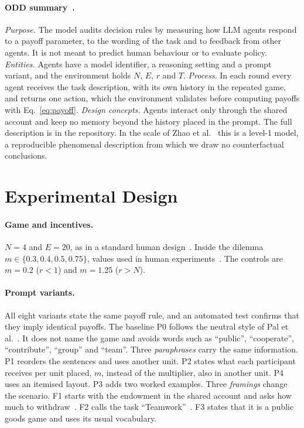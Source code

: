 \documentclass[runningheads]{llncs}
\begin{document}
\paragraph{ODD summary~\cite{grimm2020odd}.}
\emph{Purpose.} The model audits decision rules by measuring how LLM agents respond to a payoff parameter, to the wording of the task and to feedback from other agents. It is not meant to predict human behaviour or to evaluate policy. \emph{Entities.} Agents have a model identifier, a reasoning setting and a prompt variant, and the environment holds $N$, $E$, $r$ and $T$. \emph{Process.} In each round every agent receives the task description, with its own history in the repeated game, and returns one action, which the environment validates before computing payoffs with Eq.~\eqref{eq:payoff}. \emph{Design concepts.} Agents interact only through the shared account and keep no memory beyond the history placed in the prompt. The full description is in the repository. In the scale of Zhao et al.~\cite{zhao2026mechanism} this is a level-1 model, a reproducible phenomenal description from which we draw no counterfactual conclusions.

\section{Experimental Design}
\label{sec:design}

\paragraph{Game and incentives.} $N=4$ and $E=20$, as in a standard human design~\cite{fischbacher2010social}. Inside the dilemma $m\in\{0.3, 0.4, 0.5, 0.75\}$, values used in human experiments~\cite{isaac1988group,fischbacher2010social}. The controls are $m=0.2$ ($r<1$) and $m=1.25$ ($r>N$).

\paragraph{Prompt variants.} All eight variants state the same payoff rule, and an automated test confirms that they imply identical payoffs. The baseline P0 follows the neutral style of Pal et al.~\cite{pal2026llm}. It does not name the game and avoids words such as ``public'', ``cooperate'', ``contribute'', ``group'' and ``team''. Three \emph{paraphrases} carry the same information. P1 reorders the sentences and uses another unit. P2 states what each participant receives per unit placed, $m$, instead of the multiplier, also in another unit. P4 uses an itemised layout. P3 adds two worked examples. Three \emph{framings} change the scenario. F1 starts with the endowment in the shared account and asks how much to withdraw~\cite{andreoni1995warm}. F2 calls the task ``Teamwork''~\cite{sreedhar2025simulating}. F3 states that it is a public goods game and uses its usual vocabulary.
\end{document}
